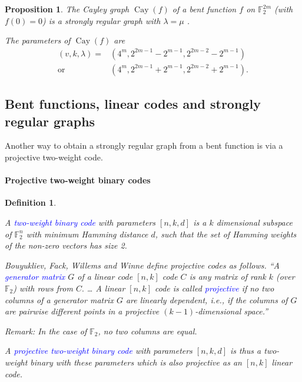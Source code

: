 \documentclass[12pt,a4paper]{article}
\newcommand{\mb}[1]{\mathbb{#1}}
\newcommand{\F}{\mb{F}}
\newcommand{\Emph}[1]{\emph{\textcolor{blue}{#1}}}
\newcommand{\Cay}[1]{\operatorname{Cay}\left(#1\right)}
\newtheorem{Proposition}{Proposition}
\newtheorem{Definition}{Definition}
\begin{document}


\begin{Proposition}
\label{pr-Cayley-bent-strongly-regular}
The Cayley graph $\Cay{f}$ of a bent function $f$ on $\F_2^{2m}$
(with $f(0)=0$) is a strongly regular graph with $\lambda = \mu$ \cite[Lemma 12]{BerC99}.

The parameters of $\Cay{f}$ are \cite[Theorem 6.2.10]{Dil74} \cite[Theorem 3.2]{HuaY04}
\begin{align*}
(v,k,\lambda) = &(4^m, 2^{2 m - 1} - 2^{m-1}, 2^{2 m - 2} - 2^{m-1})
\\
  \text{or} \quad &(4^m, 2^{2 m - 1} + 2^{m-1}, 2^{2 m - 2} + 2^{m-1}).
\end{align*}
\end{Proposition}

%
\subsection{Bent functions, linear codes and strongly regular graphs}
Another way to obtain a strongly regular graph from a bent function is via a projective two-weight
code.
\paragraph*{Projective two-weight binary codes}

\begin{Definition}
\label{def-two-weight-codes}
\cite{BouFFWW2006} \cite{Ton96uniformly}

A \Emph{two-weight binary code} with parameters $[n,k,d]$ is a $k$ dimensional subspace of $\F_2^n$
with
minimum Hamming distance $d$, such that the set of Hamming weights of the non-zero vectors has size
2.

Bouyukliev, Fack, Willems and Winne \cite[p. 60]{BouFFWW2006} define projective codes as follows.
``A \Emph{generator matrix} $G$ of a linear code $[n, k]$ code $C$ is any matrix
of rank $k$ (over $\F_2$) with rows from $C.$ \ldots
A linear $[n, k]$ code is called \Emph{projective} if no two columns of a generator matrix
$G$ are linearly dependent, i.e., if the columns of $G$ are pairwise different points in a
projective $(k-1)$-dimensional space.''

Remark: In the case of $\F_2$, no two columns are equal.

A \Emph{projective two-weight binary code} with parameters $[n, k, d]$ is thus a
two-weight binary with these parameters which is also projective as an $[n, k]$ linear code.
%
%
%
\end{Definition}
\end{document}
